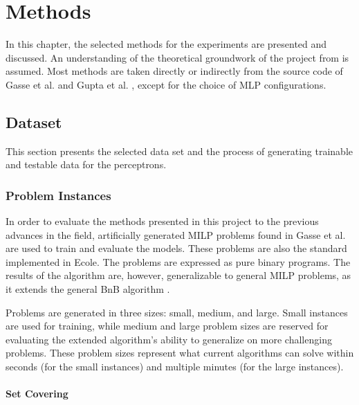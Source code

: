 \chapter{Methods}\label{cha:methods}

In this chapter, the selected methods for the experiments are presented and discussed.  
An understanding of the theoretical groundwork of the project from  is assumed. Most methods are taken directly or indirectly from the source code of Gasse et al. \cite{gasse2019exact} and Gupta et al. \cite{gupta2020hybrid}, except for the choice of \gls{MLP} configurations.


\section{Dataset}\label{sec:dataset}

This section presents the selected data set and the process of generating trainable and testable data for the perceptrons. 


\subsection{Problem Instances}\label{ssec:probleminstances}

In order to evaluate the methods presented in this project to the previous advances in the field, artificially generated \gls{MILP} problems found in Gasse et al. \cite{gasse2019exact} are used to train and evaluate the models. These problems are also the standard implemented in \gls{Ecole}.
The problems are expressed as pure binary programs. The results of the algorithm are, however, generalizable to general \gls{MILP} problems, as it extends the general \gls{BnB} algorithm \cite{gasse2019exact}. 

Problems are generated in three sizes: small, medium, and large. Small instances are used for training, while medium and large problem sizes are reserved for evaluating the extended algorithm's ability to generalize on more challenging problems. These problem sizes represent what current algorithms can solve within seconds (for the small instances) and multiple minutes (for the large instances).


\subsubsection{Set Covering}

